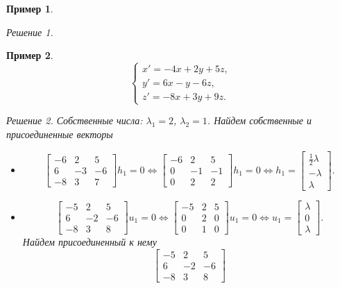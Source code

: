 \documentclass[a5paper, 11pt]{article}
\theoremstyle{definition}
\theoremstyle{plain}
\newtheorem{Ex}{Пример}
\theoremstyle{remark}
\newtheorem*{Solution}{Решение}
\begin{document}
\begin{Ex}
\begin{Solution}
		\end{Solution}
	\end{Ex}
	\begin{Ex}
		\[
		\begin{cases}
			x' = -4x+2y+5z,\\
			y' = 6x-y-6z,\\
			z' = -8x + 3y + 9z.
		\end{cases}
		\]
		\begin{Solution}
			Собственные числа: $\lambda_1 = 2$, $\lambda_2 = 1$.
			Найдем собственные и присоединенные векторы
			\begin{itemize}
				\item[$\boxed{\lambda_1 = 2}$]
				\[
				\begin{bmatrix}
					-6 & 2 & 5\\
					6 & -3 & -6\\
					-8 & 3 & 7
				\end{bmatrix} h_1 = 0 \Leftrightarrow \begin{bmatrix}
				-6 & 2 & 5\\
				0 & -1 & -1\\
				0 & 2 & 2 
			\end{bmatrix} h_1 = 0 \Leftrightarrow h_1 = \begin{bmatrix}
			 \frac12\lambda \\
			-\lambda \\
			\lambda 
		\end{bmatrix}.
				\]
				\item[$\boxed{\lambda_2 = 1}$]
			\[
			\begin{bmatrix}
				-5 & 2 & 5\\
				6 & -2 & -6\\
				-8 & 3 & 8
			\end{bmatrix} u_1 = 0 \Leftrightarrow \begin{bmatrix}
				-5 & 2 & 5\\
				0 & 2 & 0\\
				0 & 1 & 0 
			\end{bmatrix} u_1 = 0 \Leftrightarrow u_1 = \begin{bmatrix}
				\lambda\\
				0 \\
				\lambda
			\end{bmatrix}.
			\]
			Найдем присоединенный к нему
			\[
			\begin{bmatrix}
				-5 & 2 & 5\\
				6 & -2 & -6\\
				-8 & 3 & 8

\end{bmatrix}\]
\end{itemize}
\end{Solution}
\end{Ex}
\end{document}
